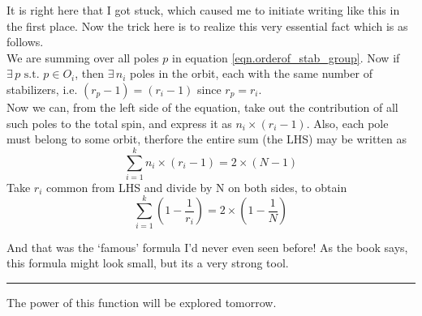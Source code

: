 \documentclass[12pt]{article}
\begin{document}
\par
It is right here that I got stuck, which caused me to initiate writing like this in the first place. Now the trick here is to realize this very essential fact which is as follows.\\
We are summing over all poles $p$ in equation \ref{eqn.orderof_stab_group}. Now if $\exists\,p \text{   s.t. } p \in O_{i}$, then $\exists\,n_{i}$ poles in the orbit, each with the same number of stabilizers, i.e. $(r_{p} - 1) = (r_{i} -1)$ since $r_{p}=r_{i}$.\\ 
Now we can, from the left side of the equation, take out the contribution of all such poles to the total spin, and express it as $n_{i} \times (r_{i}-1)$. Also, each pole must belong to some orbit, therfore the entire sum (the LHS) may be written as
\begin{equation}
\sum\limits_{i=1}^{k} n_{i} \times (r_{i}-1) = 2 \times (N - 1)
\label{eqn.D}
\end{equation}
Take $r_{i}$ common from LHS and divide by N on both sides, to obtain
\begin{equation}
\sum\limits_{i=1}^{k} (1 - \frac{1}{r_{i}}) = 2 \times (1 - \frac{1}{N})
\label{eqn.E}
\end{equation}
\par
And that was the `famous' formula I'd never even seen before! As the book says, this formula might look small, but its a very strong tool.\\
\hrule
\par
The power of this function will be explored tomorrow.



\end{document}
